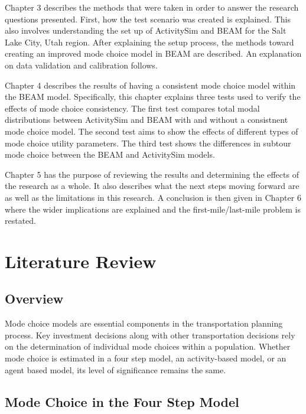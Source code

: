 \documentclass[3p, authoryear, review]{elsarticle} %
\begin{document}
Chapter 3 describes the methods that were taken in order to answer the research questions presented. First, how the test scenario was created is explained. This also involves understanding the set up of ActivitySim and BEAM for the Salt Lake City, Utah region. After explaining the setup process, the methods toward creating an improved mode choice model in BEAM are described. An explanation on data validation and calibration follows.

Chapter 4 describes the results of having a consistent mode choice model within the BEAM model. Specifically, this chapter explains three tests used to verify the effects of mode choice consistency. The first test compares total modal distributions between ActivitySim and BEAM with and without a consistnent mode choice model. The second test aims to show the effects of different types of mode choice utility parameters. The third test shows the differences in subtour mode choice between the BEAM and ActivitySim models.

Chapter 5 has the purpose of reviewing the results and determining the effects of the research as a whole. It also describes what the next steps moving forward are as well as the limitations in this research. A conclusion is then given in Chapter 6 where the wider implications are explained and the first-mile/last-mile problem is restated.

\hypertarget{literature-review}{%
\section{Literature Review}\label{literature-review}}

\hypertarget{overview}{%
\subsection{Overview}\label{overview}}

Mode choice models are essential components in the transportation planning process. Key investment decisions along with other transportation decisions rely on the determination of individual mode choices within a population. Whether mode choice is estimated in a four step model, an activity-based model, or an agent based model, its level of significance remains the same.

\hypertarget{lit1}{%
\subsection{Mode Choice in the Four Step Model}\label{lit1}}
\end{document}
